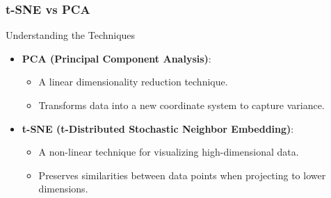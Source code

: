 \documentclass[aspectratio=169]{beamer}
\begin{document}
\begin{frame}[fragile]
    \frametitle{t-SNE vs PCA}
    \begin{block}{Understanding the Techniques}
        \begin{itemize}
            \item \textbf{PCA (Principal Component Analysis)}:
                \begin{itemize}
                    \item A linear dimensionality reduction technique.
                    \item Transforms data into a new coordinate system to capture variance.
                \end{itemize}
            \item \textbf{t-SNE (t-Distributed Stochastic Neighbor Embedding)}:
                \begin{itemize}
                    \item A non-linear technique for visualizing high-dimensional data.
                    \item Preserves similarities between data points when projecting to lower dimensions.
                \end{itemize}
        \end{itemize}
    \end{block}
\end{frame}
\end{document}
